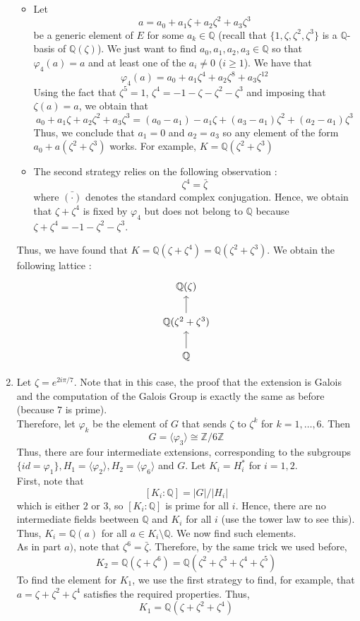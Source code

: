 \documentclass[12pt,a4paper]{article}
\begin{document}
\begin{enumerate}[label = \alph*)]
	\begin{itemize}
		\item Let \[a = a_0 + a_1\zeta + a_2\zeta^2 + a_3\zeta^3\] be a generic element of $E$ for some $a_k \in \mathbb{Q}$ (recall that $\{1, \zeta, \zeta^2, \zeta^3 \}$ is a $\mathbb{Q}$-basis of $\mathbb{Q}(\zeta)$). We just want to find $a_0, a_1, a_2, a_3 \in \mathbb{Q}$ so that $\varphi_4(a) = a$ and at least one of the $a_i \neq 0$ ($i \geq 1$). We have that \[ \varphi_4(a) = a_0 + a_1\zeta^4 + a_2\zeta^8 + a_3\zeta^{12} \] Using the fact that $\zeta^5 = 1$, $\zeta^4 = -1 - \zeta - \zeta^2 - \zeta^3$ and imposing that $\zeta(a) = a$, we obtain that \[ a_0 + a_1\zeta + a_2\zeta^2 + a_3\zeta^3 = (a_0 - a_1) - a_1\zeta + (a_3 - a_1)\zeta^2 + (a_2 - a_1)\zeta^3 \] Thus, we conclude that $a_1 = 0$ and $a_2 = a_3$ so any element of the form $a_0 + a(\zeta^2 + \zeta^3)$ works. For example, $K = \mathbb{Q}(\zeta^2 + \zeta^3)$
		\item The second strategy relies on the following observation : \[\zeta^4 = \bar{\zeta}\] where $\bar{(\cdot)}$ denotes the standard complex conjugation. Hence, we obtain that $\zeta + \zeta^4$ is fixed by $\varphi_4$ but does not belong to $\mathbb{Q}$ because $\zeta + \zeta^4 = -1 - \zeta^2 - \zeta^3$.
	\end{itemize}
	Thus, we have found that $K = \mathbb{Q}(\zeta + \zeta^4) = \mathbb{Q}(\zeta^2 + \zeta^3)$. We obtain the following lattice : \[  
	\begin{tikzcd}
	\mathbb{Q}(\zeta) \\
	\mathbb{Q}(\zeta^2 + \zeta^3) \arrow [u] \\
	\mathbb{Q} \arrow[u]
	\end{tikzcd} \]
	
	\item Let $\zeta = e^{2i\pi / 7}$. Note that in this case, the proof that the extension is Galois and the computation of the Galois Group is exactly the same as before (because $7$ is prime). \\
	Therefore, let $\varphi_k$ be the element of $G$ that sends $\zeta$ to $\zeta^k$ for $k = 1, \dots, 6$. Then \[ G = \langle \varphi_3 \rangle \cong \mathbb{Z}/6\mathbb{Z} \] Thus, there are four intermediate extensions, corresponding to the subgroups $\{id = \varphi_1\}, H_1 = \langle \varphi_2 \rangle, H_2 = \langle \varphi_6 \rangle$ and $G$. Let $K_i = H_i^*$ for $i = 1, 2$. \\ First, note that \[ [K_i : \mathbb{Q}] = |G|/|H_i| \] which is either $2$ or $3$, so $[K_i : \mathbb{Q}]$ is prime for all $i$. Hence, there are no intermediate fields beetween $\mathbb{Q}$ and $K_i$ for all $i$ (use the tower law to see this). Thus, $K_i = \mathbb{Q}(a)$ for all $a \in K_i \setminus \mathbb{Q}$. We now find such elements. \\
	As in part $a)$, note that $\zeta^6 = \bar{\zeta}$. Therefore, by the same trick we used before, \[ K_2 = \mathbb{Q}(\zeta + \zeta^6) = \mathbb{Q}(\zeta^2 + \zeta^3 + \zeta^4 + \zeta^5)\]
	To find the element for $K_1$, we use the first strategy to find, for example, that $a = \zeta + \zeta^2 + \zeta^4$ satisfies the required properties. Thus, \[ K_1 = \mathbb{Q}(\zeta + \zeta^2 + \zeta^4) \] 
	

\end{enumerate}
\end{document}
